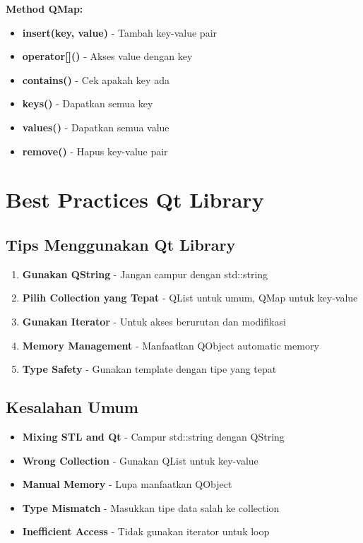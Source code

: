 \textbf{Method QMap:}
\begin{itemize}
\item \textbf{insert(key, value)} - Tambah key-value pair
\item \textbf{operator[]()} - Akses value dengan key
\item \textbf{contains()} - Cek apakah key ada
\item \textbf{keys()} - Dapatkan semua key
\item \textbf{values()} - Dapatkan semua value
\item \textbf{remove()} - Hapus key-value pair
\end{itemize}

\section{Best Practices Qt Library}

\subsection{Tips Menggunakan Qt Library}

\begin{enumerate}
\item \textbf{Gunakan QString} - Jangan campur dengan std::string
\item \textbf{Pilih Collection yang Tepat} - QList untuk umum, QMap untuk key-value
\item \textbf{Gunakan Iterator} - Untuk akses berurutan dan modifikasi
\item \textbf{Memory Management} - Manfaatkan QObject automatic memory
\item \textbf{Type Safety} - Gunakan template dengan tipe yang tepat
\end{enumerate}

\subsection{Kesalahan Umum}

\begin{itemize}
\item \textbf{Mixing STL and Qt} - Campur std::string dengan QString
\item \textbf{Wrong Collection} - Gunakan QList untuk key-value
\item \textbf{Manual Memory} - Lupa manfaatkan QObject
\item \textbf{Type Mismatch} - Masukkan tipe data salah ke collection
\item \textbf{Inefficient Access} - Tidak gunakan iterator untuk loop
\end{itemize}


